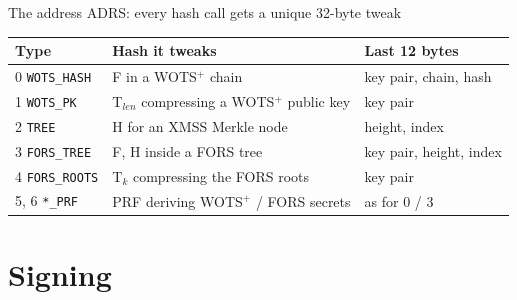 \documentclass[aspectratio=169,11pt]{beamer}
\begin{document}
\begin{frame}{The address ADRS: every hash call gets a unique 32-byte tweak}
  \centering
  \vspace{3mm}

  \small
  \begin{tabular}{@{}l l l@{}}
    \toprule
    Type & Hash it tweaks & Last 12 bytes \\
    \midrule
    0 \texttt{WOTS\_HASH}  & F in a WOTS$^+$ chain & key pair, chain, hash \\
    1 \texttt{WOTS\_PK}    & T$_{\mathit{len}}$ compressing a WOTS$^+$ public key & key pair \\
    2 \texttt{TREE}        & H for an XMSS Merkle node & height, index \\
    3 \texttt{FORS\_TREE}  & F, H inside a FORS tree & key pair, height, index \\
    4 \texttt{FORS\_ROOTS} & T$_k$ compressing the FORS roots & key pair \\
    5, 6 \texttt{*\_PRF}   & PRF deriving WOTS$^+$ / FORS secrets & as for 0 / 3 \\
    \bottomrule
  \end{tabular}
\end{frame}

\section{Signing}
\end{document}
